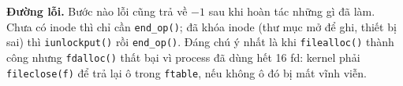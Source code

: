 \textbf{Đường lỗi.} Bước nào lỗi cũng trả về $-1$ sau khi hoàn tác những gì đã làm. Chưa có inode thì chỉ cần \texttt{end\_op()}; đã khóa inode (thư mục mở để ghi, thiết bị sai) thì \texttt{iunlockput()} rồi \texttt{end\_op()}. Đáng chú ý nhất là khi \texttt{filealloc()} thành công nhưng \texttt{fdalloc()} thất bại vì process đã dùng hết 16 fd: kernel phải \texttt{fileclose(f)} để trả lại ô trong \texttt{ftable}, nếu không ô đó bị mất vĩnh viễn.
